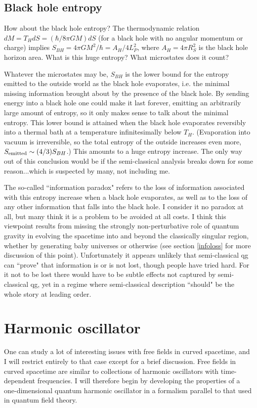 \documentclass[12pt]{article}
\newcommand{\sect}[1]{\section{#1}\setcounter{equation}{0}}
\begin{document}
\subsection{Black hole entropy}

How about the black hole entropy? The thermodynamic relation
$dM=T_H dS=(\hbar/8\pi GM) dS$ (for a black hole with 
no angular momentum or charge) implies
$S_{BH}=4\pi G M^2/\hbar= A_H/4L_P^2$,
where $A_H=4\pi R_S^2$ is the black hole horizon area. 
What is this huge entropy? What microstates does it count?

Whatever the microstates may be, $S_{BH}$ is the
lower bound for the entropy emitted to the outside world 
as the black hole evaporates, i.e. the minimal missing information
brought about by the presence of the black hole. 
By sending energy into a black hole one could make it last
forever, emitting an arbitrarily large amount of entropy, so 
it only makes sense to talk about the minimal entropy.
This lower bound is attained 
when the black hole evaporates reversibly into a thermal bath at
a temperature infinitesimally below $T_H$.
(Evaporation into vacuum is irreversible, so the 
total entropy of the outside increases even more\cite{Zurek},
$S_{\rm emitted}\sim (4/3) S_{BH}$.)
This amounts to a huge entropy increase.
The only way out of this conclusion would be 
if the  semi-classical analysis breaks down
for some reason...which is suspected by many,
not including me.

The so-called ``information paradox" refers to the
loss of information associated with this entropy increase
when a black hole evaporates,
as well as to the loss of any other
information that falls into the black hole. I consider it no
paradox at all, but many think it is a problem to be
avoided at all costs. I think this viewpoint 
results from
missing the strongly non-perturbative role
of quantum gravity in evolving the spacetime 
into and beyond the classically singular region,
whether by generating baby universes or otherwise
(see section \ref{infoloss} for more discussion of this point).
Unfortunately it
appears unlikely that semi-classical qg can ``prove"
that information is or is not lost, though people have
tried hard. For it not
to be lost there would have to be subtle
effects not captured by semi-classical qg, yet
in a regime where semi-classical description 
``should" be the whole story at leading order.

\sect{Harmonic oscillator}

One can study a lot of interesting issues with free fields in
curved spacetime, and I will restrict entirely to that
case except for a brief discussion. 
Free fields in curved spacetime are similar 
to collections of harmonic oscillators with time-dependent
frequencies. I will therefore begin by developing the properties 
of a one-dimensional quantum 
harmonic oscillator in a formalism  parallel to that used
in quantum field theory. 
\end{document}
